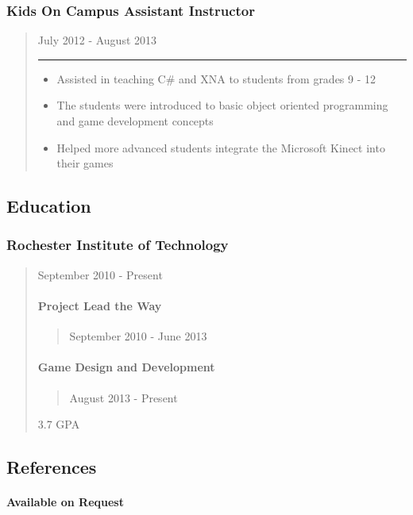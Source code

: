 \documentclass[line,margin]{res}
\begin{document}
\subsubsection{Kids On Campus Assistant
Instructor}
\begin{quote}
July 2012 - August 2013
\begin{center}\rule{3in}{0.4pt}\end{center}
\begin{itemize}
\itemsep1pt\parskip0pt
\item
  Assisted in teaching C\# and XNA to students from grades 9 - 12
\item
  The students were introduced to basic object oriented programming and
  game development concepts
\item
  Helped more advanced students integrate the Microsoft Kinect into
  their games
\end{itemize}
\end{quote}
\subsection{Education}
\subsubsection{Rochester Institute of
Technology}
\begin{quote}
September 2010 - Present
\paragraph{Project Lead the Way}
\begin{quote}
September 2010 - June 2013
\end{quote}
\paragraph{Game Design and
Development}
\begin{quote}
August 2013 - Present
\end{quote}
3.7 GPA
\end{quote}
\subsection{References}
\paragraph{Available on Request}
\end{document}
